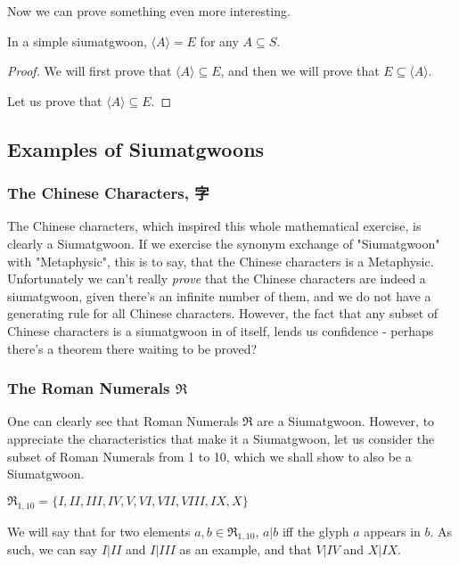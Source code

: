 Now we can prove something even more interesting. 
\begin{theorem}[$\langle A \rangle = E$ in simple siumatgwoons]\label{thm:hais-of-sets-are-siumatgwoons}
    In a simple siumatgwoon, $\langle A \rangle = E$ for any $A\subseteq S$.
\end{theorem}
\begin{proof}
    We will first prove that $\langle A \rangle \subseteq E$, and then we will prove that $E \subseteq \langle A \rangle$.

    Let us prove that $\langle A \rangle \subseteq E$.  


 
\end{proof}
\subsection{Examples of Siumatgwoons}



\subsubsection{The Chinese Characters, 字}

The Chinese characters, which inspired this whole mathematical exercise, is clearly a Siumatgwoon. If we exercise the synonym exchange of "Siumatgwoon" with "Metaphysic", this is to say, that the Chinese characters is a Metaphysic. Unfortunately we can't really \textit{prove} that the Chinese characters are indeed a siumatgwoon, given there's an infinite number of them, and we do not have a generating rule for all Chinese characters. However, the fact that any subset of Chinese characters is a siumatgwoon in of itself, lends us confidence - perhaps there's a theorem there waiting to be proved?

\subsubsection{The Roman Numerals $\mathfrak{R}$}

One can clearly see that Roman Numerals $\mathfrak{R}$ are a Siumatgwoon. However, to appreciate the characteristics that make it a Siumatgwoon, let us consider the subset of Roman Numerals from 1 to 10, which we shall show to also be a Siumatgwoon.

$\mathfrak{R}_{1,10} = \{I, II, III, IV, V, VI, VII, VIII, IX, X\}$

We will say that for two elements $a,b \in \mathfrak{R}_{1,10}$, $a|b$ iff the glyph $a$ appears in $b$. As such, we can say $I | II$ and $I|III$ as an example, and that $V|IV$ and $X|IX$. 

